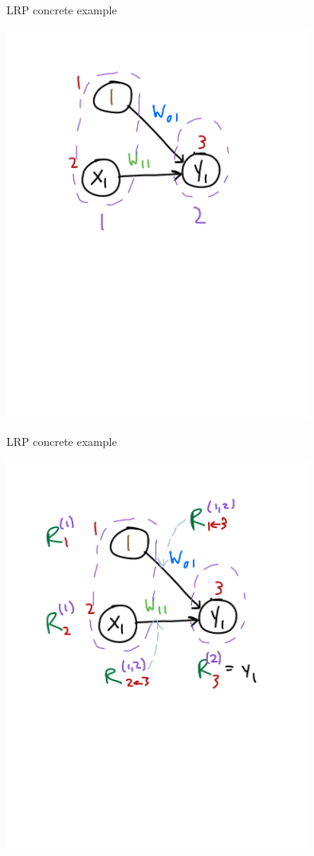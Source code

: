 \documentclass[xetex,compress]{beamer}
\begin{document}
\begin{frame}{LRP concrete example}
  \begin{center}
    \includegraphics[width=0.75\textwidth]{./figures/lr_nn_5.pdf}
  \end{center}
\end{frame}

\begin{frame}{LRP concrete example}
  \begin{center}
    \includegraphics[width=0.75\textwidth]{./figures/lr_nn_6.pdf}
  \end{center}
\end{frame}
\end{document}
